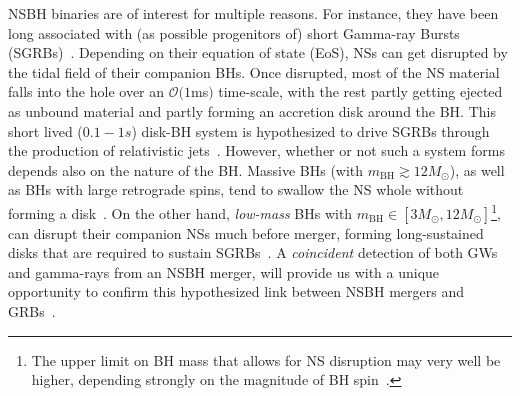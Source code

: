 \documentclass[aps,prd,amsmath,floats,floatfix, twocolumn,
superscriptaddress,nofootinbib,showpacs]{revtex4-1}
\newcommand{\mbh}{m_\mathrm{BH}}
\begin{document}
NSBH binaries are of interest for multiple reasons. For instance,
they have been long associated with (as possible progenitors of) short
Gamma-ray Bursts (SGRBs)~\cite{eichler:89,1992ApJ...395L..83N,moch:93,Barthelmy:2005bx,
2005Natur.437..845F,2005Natur.437..851G,Shibata:2005mz,Paschalidis2014,
Tanvir:2013}. Depending on their equation of state (EoS), NSs can get disrupted by
the tidal field of their companion BHs. Once disrupted, most of the NS
material falls into the hole over an $\mathcal{O}(1$ms$)$ time-scale,
with the rest partly getting ejected as unbound material
and partly forming an accretion disk around the BH.
% 
This short lived ($0.1-1s$) disk-BH system is hypothesized to drive SGRBs
through the production of relativistic jets~\cite{Foucart:2015a,
Lovelace:2013vma,Deaton2013,Foucart2012,Shibata:2005mz,Paschalidis2014}.
% 
However, whether or not such a system forms depends also on the nature of
the BH. Massive BHs (with $\mbh\gtrsim 12M_\odot$), as well as BHs with
large retrograde spins, tend to swallow the NS whole without forming a
disk~\cite{Foucart:2013psa}.
% 
On the other hand, {\it low-mass} BHs with $\mbh\in[3M_\odot, 12M_\odot]$\footnote{
The upper limit on BH mass that allows for NS disruption may very well be
higher, depending strongly on the magnitude of BH spin~\cite{Foucart:2014nda}.},
can disrupt their companion NSs much before merger, forming long-sustained disks
that are required to sustain SGRBs~\cite{Shibata:2007zm,2010PhRvD..81f4026F,
Lovelace:2013vma,Foucart:2014nda,Kawaguchi:2015}.
% 
A {\it coincident} detection of both GWs and gamma-rays from an NSBH merger,
will provide us with a unique opportunity to confirm this hypothesized link
between NSBH mergers and GRBs~\cite{Abbott:2016wya}.
\end{document}
